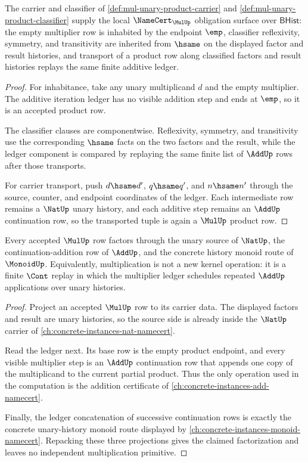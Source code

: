 \begin{theorem}
\label{thm:mul-unary-product-namecert-obligations}
The carrier and classifier of \autoref{def:mul-unary-product-carrier} and \autoref{def:mul-unary-product-classifier} supply the local $\NameCert_{\MulUp}$ obligation surface over $\mathsf{BHist}$: the empty multiplier row is inhabited by the endpoint $\emp$, classifier reflexivity, symmetry, and transitivity are inherited from $\hsame$ on the displayed factor and result histories, and transport of a product row along classified factors and result histories replays the same finite additive ledger.
\end{theorem}
\begin{proof}
For inhabitance, take any unary multiplicand $d$ and the empty multiplier. The additive iteration ledger has no visible addition step and ends at $\emp$, so it is an accepted product row.

The classifier clauses are componentwise. Reflexivity, symmetry, and transitivity use the corresponding $\hsame$ facts on the two factors and the result, while the ledger component is compared by replaying the same finite list of $\AddUp$ rows after those transports.

For carrier transport, push $d\hsame d'$, $q\hsame q'$, and $n\hsame n'$ through the source, counter, and endpoint coordinates of the ledger. Each intermediate row remains a $\NatUp$ unary history, and each additive step remains an $\AddUp$ continuation row, so the transported tuple is again a $\MulUp$ product row.
\end{proof}

\begin{theorem}
\label{thm:mul-unary-product-additive-route}
Every accepted $\MulUp$ row factors through the unary source of $\NatUp$, the continuation-addition row of $\AddUp$, and the concrete history monoid route of $\MonoidUp$. Equivalently, multiplication is not a new kernel operation: it is a finite $\Cont$ replay in which the multiplier ledger schedules repeated $\AddUp$ applications over unary histories.
\end{theorem}
\begin{proof}
Project an accepted $\MulUp$ row to its carrier data. The displayed factors and result are unary histories, so the source side is already inside the $\NatUp$ carrier of \autoref{ch:concrete-instances-nat-namecert}.

Read the ledger next. Its base row is the empty product endpoint, and every visible multiplier step is an $\AddUp$ continuation row that appends one copy of the multiplicand to the current partial product. Thus the only operation used in the computation is the addition certificate of \autoref{ch:concrete-instances-add-namecert}.

Finally, the ledger concatenation of successive continuation rows is exactly the concrete unary-history monoid route displayed by \autoref{ch:concrete-instances-monoid-namecert}. Repacking these three projections gives the claimed factorization and leaves no independent multiplication primitive.
\end{proof}

